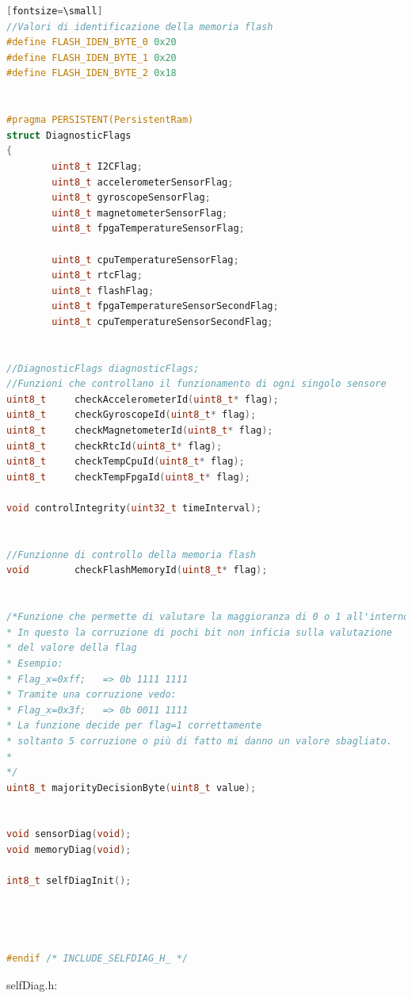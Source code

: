 \documentclass[LaM,binding=0.6cm]{../sapthesis}
\begin{document}
\begin{lstlisting}[language=c][fontsize=\small]
//Valori di identificazione della memoria flash
#define FLASH_IDEN_BYTE_0 0x20
#define FLASH_IDEN_BYTE_1 0x20
#define FLASH_IDEN_BYTE_2 0x18


#pragma PERSISTENT(PersistentRam)
struct DiagnosticFlags
{
        uint8_t I2CFlag;                           
        uint8_t accelerometerSensorFlag;
        uint8_t gyroscopeSensorFlag;
        uint8_t magnetometerSensorFlag;
        uint8_t fpgaTemperatureSensorFlag;

        uint8_t cpuTemperatureSensorFlag;
        uint8_t rtcFlag;
        uint8_t flashFlag;
        uint8_t fpgaTemperatureSensorSecondFlag;
        uint8_t cpuTemperatureSensorSecondFlag;		


//DiagnosticFlags diagnosticFlags;
//Funzioni che controllano il funzionamento di ogni singolo sensore
uint8_t     checkAccelerometerId(uint8_t* flag);
uint8_t     checkGyroscopeId(uint8_t* flag);
uint8_t     checkMagnetometerId(uint8_t* flag);
uint8_t     checkRtcId(uint8_t* flag);
uint8_t     checkTempCpuId(uint8_t* flag);
uint8_t     checkTempFpgaId(uint8_t* flag);

void controlIntegrity(uint32_t timeInterval);


//Funzionne di controllo della memoria flash
void        checkFlashMemoryId(uint8_t* flag);


/*Funzione che permette di valutare la maggioranza di 0 o 1 all'interno di un byte.
* In questo la corruzione di pochi bit non inficia sulla valutazione 
* del valore della flag
* Esempio:
* Flag_x=0xff;   => 0b 1111 1111
* Tramite una corruzione vedo:
* Flag_x=0x3f;   => 0b 0011 1111
* La funzione decide per flag=1 correttamente
* soltanto 5 corruzione o più di fatto mi danno un valore sbagliato.
*
*/
uint8_t majorityDecisionByte(uint8_t value);


void sensorDiag(void);
void memoryDiag(void);

int8_t selfDiagInit();




#endif /* INCLUDE_SELFDIAG_H_ */
\end{lstlisting}
\newline

selfDiag.h:
\end{document}

